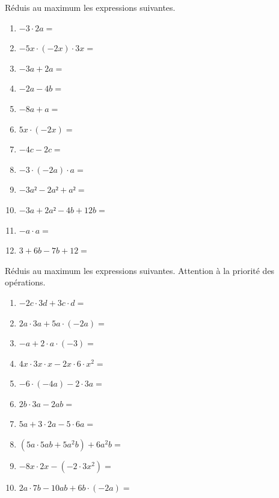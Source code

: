 \documentclass[../../syllabus_1.tex]{subfiles}
\begin{document}
\newpage
\begin{exercise}
    Réduis au maximum les expressions suivantes.
    \begin{enumerate}[cols=2, itemsep=.7cm]
        \item \(- 3 \cdot 2a =\)
        \item \(- 5x \cdot ( - 2x) \cdot 3x =\)
        \item \(- 3a + 2a =\)
        \item \(- 2a - 4b =\)
        \item \(- 8a + a =\)
        \item \(5x \cdot ( - 2x) =\)
        \item \(- 4c - 2c =\)
        \item \(- 3 \cdot ( - 2a) \cdot a =\)
        \item \(- 3a² - 2a² + a² =\)
        \item \(- 3a + 2a² - 4b + 12b =\)
        \item \(- a \cdot a =\)
        \item \(3 + 6b - 7b + 12 =\)
    \end{enumerate}
\end{exercise}

\begin{exercise}
    Réduis au maximum les expressions suivantes. Attention à la priorité des opérations.
    \begin{enumerate}[cols=2, itemsep=2cm]
        \item \(- 2c \cdot 3d + 3c \cdot d =\)
        \item \(2a \cdot 3a + 5a \cdot ( - 2a) =\)
        \item \(- a + 2 \cdot a \cdot ( - 3) =\)
        \item \(4x \cdot 3x \cdot x - 2x \cdot 6\cdot x^2 =\)
        \item \(- 6 \cdot ( - 4a) - 2 \cdot 3a =\)
        \item  \(2b \cdot 3a - 2ab =\)
        \item \(5a + 3 \cdot 2a - 5 \cdot 6a=\)
        \item \(\left(5a \cdot 5ab + 5a^2b\right) + 6a^2b=\)
        \item \(-8x\cdot 2x - (-2 \cdot 3x^2)=\)
        \item \(2a \cdot 7b - 10ab + 6b \cdot (-2a)=\)
    \end{enumerate}
\end{exercise}
\end{document}
